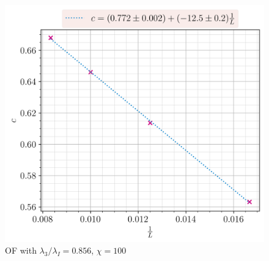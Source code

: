 \documentclass[10pt]{beamer}
\begin{document}
\begin{frame}
\begin{columns}
        \pause
        \begin{column}{0.6\linewidth}
            \begin{figure}
                \includegraphics[scale=0.43]{../../graphs/entropies/ff/calabrese_chi=100.0_J=1.0_h=1.0_i=1.0_3=0.856_c=0.0.png}
                \caption{OF with $\lambda_3/\lambda_I =0.856$, $\chi=100$}
            \end{figure}
        \end{column}        
    \end{columns}
\end{frame}
\end{document}
